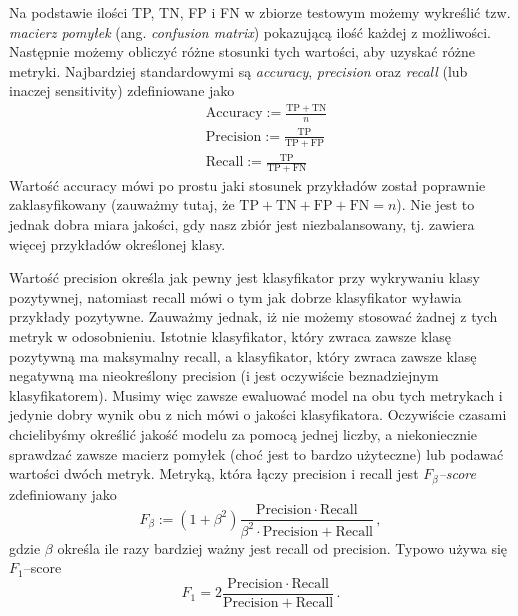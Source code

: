\documentclass{myclass}
\begin{document}
Na podstawie ilości TP, TN, FP i FN w zbiorze testowym możemy wykreślić tzw. \emph{macierz pomyłek}
(ang. \emph{confusion matrix}) pokazującą ilość każdej z możliwości. Następnie możemy obliczyć różne
stosunki tych wartości, aby uzyskać różne metryki. Najbardziej standardowymi są \emph{accuracy},
\emph{precision} oraz \emph{recall} (lub inaczej sensitivity) zdefiniowane jako
\[
\begin{split}
    & \mathrm{Accuracy} := \frac{\mathrm{TP} + \mathrm{TN}}{n}\\
    & \mathrm{Precision} := \frac{\mathrm{TP}}{\mathrm{TP} + \mathrm{FP}}\\
    & \mathrm{Recall} := \frac{\mathrm{TP}}{\mathrm{TP} + \mathrm{FN}}    
\end{split}
\]
Wartość accuracy mówi po prostu jaki stosunek przykładów został poprawnie zaklasyfikowany (zauważmy
tutaj, że \(\mathrm{TP + TN + FP + FN} = n\)). Nie jest to jednak dobra miara jakości, gdy nasz
zbiór jest niezbalansowany, tj. zawiera więcej przykładów określonej klasy.

Wartość precision określa jak pewny jest klasyfikator przy wykrywaniu klasy pozytywnej, natomiast
recall mówi o tym jak dobrze klasyfikator wyławia przykłady pozytywne. Zauważmy jednak, iż nie
możemy stosować żadnej z tych metryk w odosobnieniu. Istotnie klasyfikator, który zwraca zawsze
klasę pozytywną ma maksymalny recall, a klasyfikator, który zwraca zawsze klasę negatywną ma
nieokreślony precision (i jest oczywiście beznadziejnym klasyfikatorem). Musimy więc zawsze
ewaluować model na obu tych metrykach i jedynie dobry wynik obu z nich mówi o jakości klasyfikatora.
Oczywiście czasami chcielibyśmy określić jakość modelu za pomocą jednej liczby, a niekoniecznie
sprawdzać zawsze macierz pomyłek (choć jest to bardzo użyteczne) lub podawać wartości dwóch metryk.
Metryką, która łączy precision i recall jest \emph{\(F_\beta\)--score} zdefiniowany jako
\[
F_\beta := (1 + \beta^2) \frac{\mathrm{Precision} \cdot \mathrm{Recall}}{\beta^2 \cdot \mathrm{Precision} + \mathrm{Recall}}\,, 
\]
gdzie \(\beta\) określa ile razy bardziej ważny jest recall od precision. Typowo używa się
\(F_1\)--score
\[
F_1 = 2\frac{\mathrm{Precision} \cdot \mathrm{Recall}}{\mathrm{Precision} + \mathrm{Recall}}\,. 
\]
\end{document}
